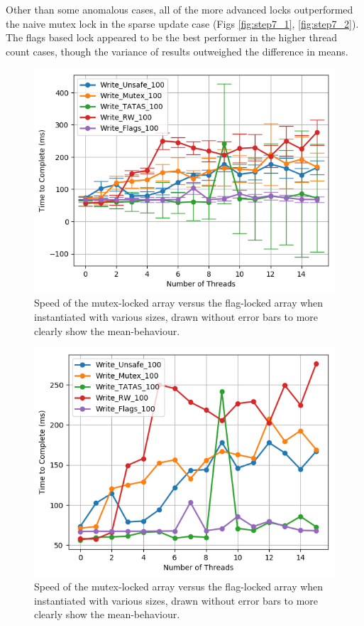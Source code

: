 \documentclass[11pt]{article}
\begin{document}
Other than some anomalous cases, all of the more advanced locks outperformed the naive mutex lock in the sparse update case (Figs \ref{fig:step7_1}, \ref{fig:step7_2}). The flags based lock appeared to be the best performer in the higher thread count cases, though the variance of results outweighed the difference in means.

\begin{figure}\label{fig:step7_3}
\centering
\includegraphics[scale=0.65]{step7_3.png}
\caption{Speed of the mutex-locked array versus the flag-locked array when instantiated with various sizes, drawn without error bars to more clearly show the mean-behaviour.}
\end{figure}

\begin{figure}\label{fig:step7_4}
\centering
\includegraphics[scale=0.65]{step7_4.png}
\caption{Speed of the mutex-locked array versus the flag-locked array when instantiated with various sizes, drawn without error bars to more clearly show the mean-behaviour.}
\end{figure}
\end{document}

